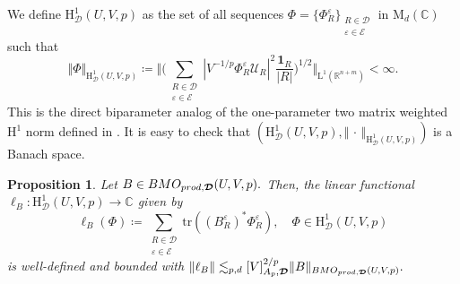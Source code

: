 \documentclass{article}
\newtheorem{proposition}[theorem]{Proposition}
\theoremstyle{definition}
\theoremstyle{remark}
\numberwithin{equation}{section}
\newcommand{\cE}{\mathcal{E}}
\newcommand{\cU}{\mathcal{U}}
\newcommand{\bfD}{\bm{\mathcal{D}}}
\newcommand{\e}{\varepsilon}
\newcommand{\reals}{\mathbb{R}}
\newcommand{\complex}{\mathbb{C}}
\newcommand{\Lp}[1]{\mathrm{L}^{#1}}
\newcommand{\1}{\mathbf{1}}
\newcommand{\var}{\,\cdot\,}
\begin{document}
    We define $\mathrm{H}^1_{\bfD}(U,V,p)$ as the set of all sequences $\Phi=\{\Phi_{R}^{\e}\}_{\substack{R\in\bfD\\\e\in\cE}}$ in $\mathrm{M}_{d}(\complex)$ such that
    \begin{equation*}
        \Vert\Phi\Vert_{\mathrm{H}^1_{\bfD}(U,V,p)}\coloneq \bigg\Vert\bigg(\sum_{\substack{R\in\bfD\\\e\in\cE}}|V^{-1/p}\Phi_{R}^{\e}\cU_{R}|^2\frac{\1_{R}}{|R|}\bigg)^{1/2}\bigg\Vert_{\Lp{1}(\reals^{n+m})}<\infty.
    \end{equation*}
    This is the direct biparameter analog of the one-parameter two matrix weighted $\mathrm{H}^1$ norm defined in \cite{Isralowitz_2017}. It is easy to check that $(\mathrm{H}^1_{\bfD}(U,V,p),\Vert\var\Vert_{\mathrm{H}^1_{\bfD}(U,V,p)})$ is a Banach space.

    \begin{proposition}
        \label{prop:BMOtofunctional}
    Let $B\in\emph{BMO}_{\emph{prod},\bfD}(U,V,p).$ Then, the linear functional $\ell_{B}:\mathrm{H}^1_{\bfD}(U,V,p)\rightarrow\complex$ given by
    \begin{equation*}
        \ell_{B}(\Phi)\coloneq \sum_{\substack{R\in\bfD\\\e\in\cE}}\mathrm{tr}((B_{R}^{\e})^{\ast}\Phi_{R}^{\e}),\quad\Phi\in \mathrm{H}^1_{\bfD}(U,V,p)
    \end{equation*}
    is well-defined and bounded with $\Vert\ell_{B}\Vert\lesssim_{p,d}[V]_{A_p,\bfD}^{2/p}\Vert B\Vert_{\emph{BMO}_{\emph{prod},\bfD}(U,V,p)}.$
    \end{proposition}
\end{document}
